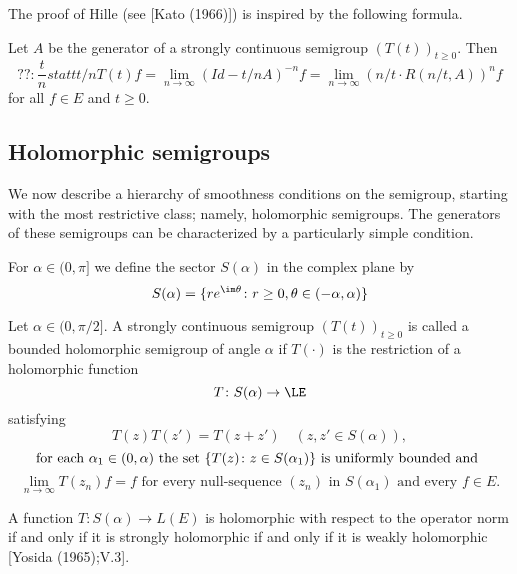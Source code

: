 The proof of Hille (see [Kato (1966)]) is inspired by the following formula.
\begin{proposition}\label{prop:a2-1.10}
Let $A$ be the generator of a strongly continuous semigroup $(T(t))_{t \geq 0}$.
Then
\begin{equation}\label{eq:a2-1.3}
  ?? : \frac{t}{n} statt t/n 
    T(t)f = \lim_{n \to \infty} (Id - t/nA)^{-n} f = \lim_{n \to \infty} (n/t \cdot R(n/t,A))^{n} f
\end{equation}
for all $f \in E$ and $t \geq 0$.
\end{proposition}
\subsection{Holomorphic semigroups} \label{subsec:a2-1.se4}

We now describe a hierarchy of smoothness conditions on the semigroup, starting with the most restrictive class; namely, holomorphic semigroups.
The generators of these semigroups can be characterized by a particularly simple condition.

For $\alpha \in (0,\pi]$ we define the sector $S(\alpha)$ in the complex plane by
\[
    S(\alpha) = \{re^{\im\theta} \colon r \geq 0, \theta \in (-\alpha,\alpha)\}
\]

\begin{definition}\label{def:a2-1.11}
Let $\alpha \in (0,\pi/2]$.
A strongly continuous semigroup $(T(t))_{t \geq 0}$ is called a bounded holomorphic semigroup of angle $\alpha$ if $T(\cdot)$ is the restriction of a holomorphic function
\[
    T \colon S(\alpha) \to \LE
\]
satisfying
\begin{equation}\label{eq:a2-1.4}
    T(z)T(z') = T(z+z') \quad (z,z' \in S(\alpha)),
\end{equation}
\[
    \text{for each } \alpha_{1} \in (0,\alpha) \text{ the set } \{T(z) \colon z \in S(\alpha_{1})\} \text{ is uniformly bounded and }\\
\]
\begin{equation}\label{eq:a2-1.5}
     \lim_{n \to \infty} T(z_{n})f = f \text{ for every null-sequence } (z_{n}) \text{ in } S(\alpha_{1}) \text{ and every } f \in E.
\end{equation}
\end{definition}

\begin{remark*}\label{rem:a2-1.5-kgk}
A function $T \colon S(\alpha) \to L(E)$ is holomorphic with respect to the operator norm if and only if it is strongly holomorphic if and only if it is weakly holomorphic [Yosida (1965);V.3].
\end{remark*}

